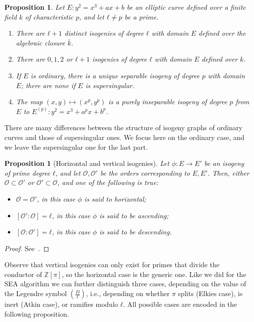 \documentclass[10pt]{article}
\theoremstyle{plain}
\newtheorem{proposition}[theorem]{Proposition}
\theoremstyle{definition}
\def\O{\ensuremath{\mathcal{O}}}
\begin{document}
\begin{proposition}
  \label{th:isog-count}
  Let $E:y^2=x^3+ax+b$ be an elliptic curve defined over a finite
  field $k$ of characteristic $p$, and let $ℓ≠p$ be a prime.

  \begin{enumerate}
  \item There are $ℓ+1$ distinct isogenies of degree $ℓ$ with domain
    $E$ defined over the algebraic closure $\bar{k}$.
  \item There are $0,1,2$ or $ℓ+1$ isogenies of degree $ℓ$ with domain
    $E$ defined over $k$.
  \item If $E$ is ordinary, there is a unique separable isogeny of
    degree $p$ with domain $E$; there are none if $E$ is
    supersingular.
  \item The map $(x,y)\mapsto(x^p,y^p)$ is a purely inseparable
    isogeny of degree $p$ from $E$ to $E^{(p)}:y^2=x^3+a^px+b^p$.
  \end{enumerate}
\end{proposition}

There are many differences between the structure of isogeny graphs of
ordinary curves and those of supersingular ones. %
We focus here on the ordinary case, and we leave the supersingular one
for the last part.

\begin{proposition}[Horizontal and vertical isogenies]
  Let $ϕ:E\to E'$ be an isogeny of prime degree $ℓ$, and let $\O,\O'$
  be the orders corresponding to $E,E'$. %
  Then, either $\O⊂\O'$ or $\O'⊂\O$, and one of the following is true:
  \begin{itemize}
  \item $\O=\O'$, in this case $ϕ$ is said to \emph{horizontal};
  \item $[\O':\O]=ℓ$, in this case $ϕ$ is said to be \emph{ascending};
  \item $[\O:\O']=ℓ$, in this case $ϕ$ is said to be \emph{descending}.
  \end{itemize}
\end{proposition}
\begin{proof}
  See~\cite[Prop.~21]{kohel}.
\end{proof}

Observe that vertical isogenies can only exist for primes that divide
the conductor of $ℤ[π]$, so the horizontal case is the generic one. %
Like we did for the SEA algorithm we can further distinguish three
cases, depending on the value of the Legendre symbol
$\left(\frac{D}{ℓ}\right)$, i.e., depending on whether $π$ splits
(Elkies case), is inert (Atkin case), or ramifies modulo $ℓ$. %
All possible cases are encoded in the following proposition.
\end{document}

